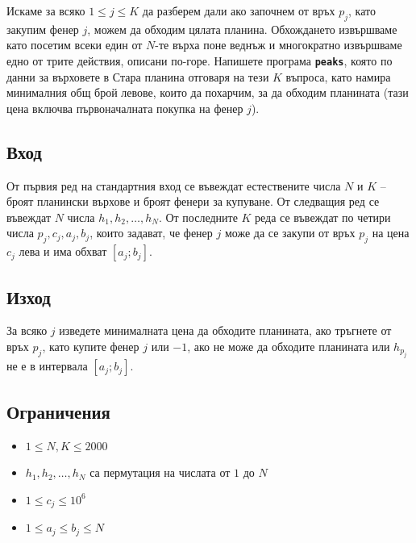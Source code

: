 \documentclass[12pt]{article}
\begin{document}
Искаме за всяко $1 \le j \le K$ да разберем дали ако започнем от връх $p_j$, като закупим фенер $j$, можем да обходим цялата планина. Обхождането извършваме като посетим всеки един от $N$-те върха поне веднъж и многократно извършваме едно от трите действия, описани по-горе. Напишете програма \textbf{\texttt{peaks}}, която по данни за върховете в Стара планина отговаря на тези $K$ въпроса, като намира минималния общ брой левове, които да похарчим, за да обходим планината (тази цена включва първоначалната покупка на фенер $j$).

\subsection{Вход}
От първия ред на стандартния вход се въвеждат естествените числа $N$ и $K$ -- броят планински върхове и броят фенери за купуване. От следващия ред се въвеждат $N$ числа $h_1, h_2, \dots, h_N$. От последните $K$ реда се въвеждат по четири числа $p_j, c_j, a_j, b_j$, които задават, че фенер $j$ може да се закупи от връх $p_j$ на цена $c_j$ лева и има обхват $[a_j; b_j]$.

\subsection{Изход}
За всяко $j$ изведете минималната цена да обходите планината, ако тръгнете от връх $p_j$, като купите фенер $j$ или $-1$, ако не може да обходите планината или $h_{p_j}$ не е в интервала $[a_j; b_j]$.

\subsection{Ограничения}
\vspace{0.1em}
\begin{itemize}
	\item $1 \leq N, K \leq 2000$
	\item $h_1, h_2, \dots, h_N$ са пермутация на числата от $1$ до $N$
	\item $1 \le c_j \le 10^6$
	\item $1 \le a_j \le b_j \le N$
\end{itemize}
\end{document}
